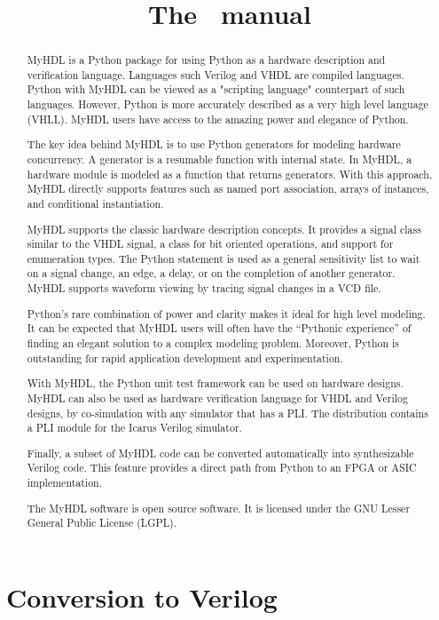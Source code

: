 \documentclass{manual}
\title{The \myhdl\ manual}
\newcommand{\myhdl}{\protect \mbox{MyHDL}}
\begin{document}
\maketitle



\begin{abstract}

\noindent

\myhdl{} is a Python package for using Python as a hardware description
and verification language. Languages such Verilog and VHDL are
compiled languages. Python with \myhdl{} can be viewed as a "scripting
language" counterpart of such languages. However, Python is more
accurately described as a very high level language (VHLL). \myhdl{} users
have access to the amazing power and elegance of Python.

The key idea behind \myhdl{} is to use Python generators for modeling
hardware concurrency. A generator is a resumable function with
internal state. In \myhdl{}, a hardware module is modeled as a function
that returns generators. With this approach, \myhdl{} directly supports
features such as named port association, arrays of instances, and
conditional instantiation. 

\myhdl{} supports the classic hardware description concepts.  It
provides a signal class similar to the VHDL signal, a class for bit
oriented operations, and support for enumeration types.  The Python
 statement is used as a general sensitivity list to wait
on a signal change, an edge, a delay, or on the completion of another
generator. \myhdl{} supports waveform viewing by tracing signal
changes in a VCD file.

Python's rare combination of power and clarity makes it ideal for high
level modeling.  It can be expected that \myhdl{} users will often
have the ``Pythonic experience'' of finding an elegant solution to a
complex modeling problem. Moreover, Python is outstanding for rapid
application development and experimentation.

With \myhdl{}, the Python unit test framework can be used on hardware
designs.  \myhdl{} can also be used as hardware verification language for
VHDL and Verilog designs, by co-simulation with any simulator that has
a PLI.  The distribution contains a PLI module for the
Icarus Verilog simulator.

Finally, a subset of \myhdl{} code can be converted automatically into
synthesizable Verilog code. This feature provides a direct path from
Python to an FPGA or ASIC implementation.

The \myhdl{} software is open source software. It is licensed under the
GNU Lesser General Public License (LGPL).




\end{abstract}

\tableofcontents







\chapter{Conversion to Verilog\label{conversion}}





\end{document}
